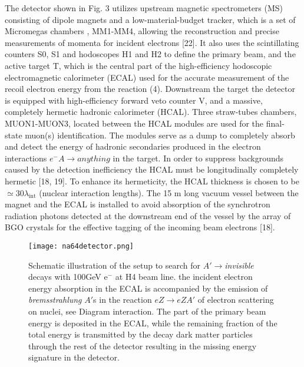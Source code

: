 The detector shown in Fig. 3 utilizes upstream magnetic spectrometers (MS) consisting of dipole magnets and a
low-material-budget tracker, which is a set of Micromegas chambers , MM1-MM4, allowing the reconstruction and precise
measurements of momenta for incident electrons [22]. It also uses the scintillating counters S0, S1 and hodoscopes H1
and H2 to define the primary beam, and the active target T, which is the central part of the high-efficiency hodoscopic
electromagnetic calorimeter (ECAL) used for the accurate measurement of the recoil electron energy from the
reaction (4). Downstream the target the detector is equipped with high-efficiency forward veto counter V, and a massive,
completely hermetic hadronic calorimeter (HCAL). Three straw-tubes chambers, MUON1-MUON3, located between the HCAL
modules are used for the final-state muon(s) identification. The modules serve as a dump to completely absorb and detect
the energy of hadronic secondaries produced in the electron interactions $e^-A\rightarrow anything$ in the target. In order to
suppress backgrounds caused by the detection inefficiency the HCAL must be longitudinally completely hermetic [18,
19]. To enhance its hermeticity, the HCAL thickness is chosen to be $\simeq  30 \lambda_{\mathrm{int}}$ (nuclear interaction lengths). The 15 m
long vacuum vessel between the magnet and the ECAL is installed to avoid absorption of the synchrotron radiation
photons detected at the downstream end of the vessel by the array of BGO crystals for the effective tagging of the
incoming beam electrons [18].


\begin{figure}[ht]
		\hspace*{\fill}
		\centering
		\texttt{[image: na64detector.png]}
		\caption{Schematic illustration of the setup to search for $A'\rightarrow${\it invisible} decays with 100GeV e$^-$
		at H4 beam line. the incident electron energy absorption in the ECAL is accompanied by the emission of
		{\it bremsstrahlung} $A'$s in the reaction $eZ\rightarrow eZA'$ of electron scattering on nuclei, see Diagram
		interaction. The part of the primary beam energy is deposited in the ECAL, while the remaining fraction of the total
		energy is transmitted by the decay dark matter particles through the rest of the detector resulting in the missing
		energy signature in the detector.}\label{fig:na64detector}
\end{figure}

